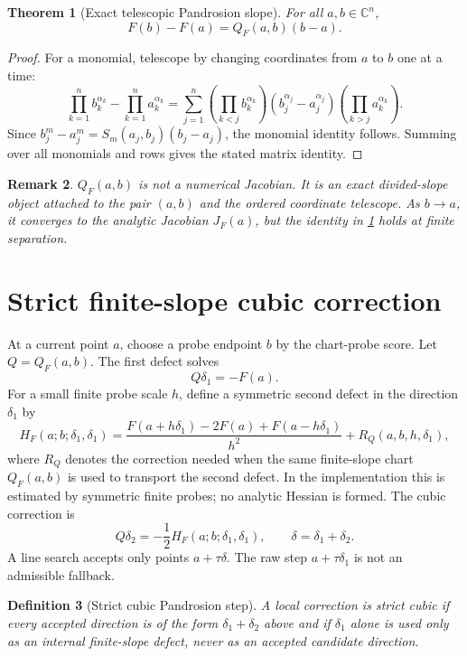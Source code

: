\documentclass[11pt]{article}
\newtheorem{definition}{Definition}[section]
\newtheorem{theorem}[definition]{Theorem}
\newtheorem{remark}[definition]{Remark}
\newcommand{\C}{\mathbb C}
\begin{document}
\begin{theorem}[Exact telescopic Pandrosion slope]\label{thm:telescopic}
For all $a,b\in\C^n$,
\[
        F(b)-F(a)=Q_F(a,b)(b-a).
\]
\end{theorem}

\begin{proof}
For a monomial, telescope by changing coordinates from $a$ to $b$ one at a time:
\[
\prod_{k=1}^n b_k^{\alpha_k}-\prod_{k=1}^n a_k^{\alpha_k}
=\sum_{j=1}^n
\left(\prod_{k<j}b_k^{\alpha_k}\right)
\left(b_j^{\alpha_j}-a_j^{\alpha_j}\right)
\left(\prod_{k>j}a_k^{\alpha_k}\right).
\]
Since $b_j^m-a_j^m=S_m(a_j,b_j)(b_j-a_j)$, the monomial identity follows.  Summing over all monomials and rows gives the stated matrix identity.
\end{proof}

\begin{remark}
$Q_F(a,b)$ is not a numerical Jacobian.  It is an exact divided-slope object attached to the pair $(a,b)$ and the ordered coordinate telescope.  As $b\to a$, it converges to the analytic Jacobian $J_F(a)$, but the identity in \cref{thm:telescopic} holds at finite separation.
\end{remark}

\section{Strict finite-slope cubic correction}

At a current point $a$, choose a probe endpoint $b$ by the chart-probe score.  Let $Q=Q_F(a,b)$.  The first defect solves
\[
        Q\delta_1=-F(a).
\]
For a small finite probe scale $h$, define a symmetric second defect in the direction $\delta_1$ by
\[
        H_F(a;b;\delta_1,\delta_1)
        =\frac{F(a+h\delta_1)-2F(a)+F(a-h\delta_1)}{h^2}
        +R_Q(a,b,h,\delta_1),
\]
where $R_Q$ denotes the correction needed when the same finite-slope chart $Q_F(a,b)$ is used to transport the second defect.  In the implementation this is estimated by symmetric finite probes; no analytic Hessian is formed.  The cubic correction is
\[
        Q\delta_2=-\frac12 H_F(a;b;\delta_1,\delta_1),
        \qquad \delta=\delta_1+\delta_2.
\]
A line search accepts only points $a+\tau\delta$.  The raw step $a+\tau\delta_1$ is not an admissible fallback.

\begin{definition}[Strict cubic Pandrosion step]
A local correction is strict cubic if every accepted direction is of the form $\delta_1+\delta_2$ above and if $\delta_1$ alone is used only as an internal finite-slope defect, never as an accepted candidate direction.
\end{definition}
\end{document}
